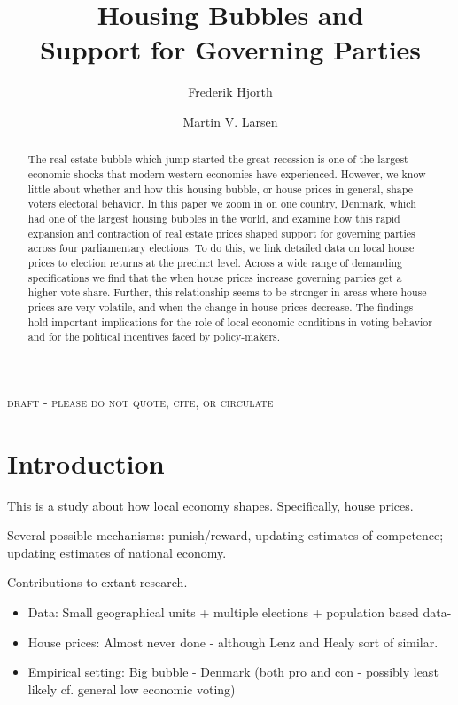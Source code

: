 \documentclass[12pt,a4paper]{article}
\title{\textbf{Housing Bubbles and \\Support for Governing Parties}}
\author{
Frederik Hjorth \and Martin V. Larsen}
\begin{document}
\maketitle

\begin{center}
\textsc{draft - please do not quote, cite, or circulate}
\end{center}

\begin{abstract}
\noindent The real estate bubble which jump-started the great recession is one of the largest economic shocks that modern western economies have experienced. However, we know little about whether and how this housing bubble, or house prices in general, shape voters electoral behavior. In this paper we zoom in on one country, Denmark, which had one of the largest housing bubbles in the world, and examine how this rapid expansion and contraction of real estate prices shaped support for governing parties across four parliamentary elections. To do this, we link detailed data on local house prices to election returns at the precinct level. Across a wide range of demanding specifications we find that the when house prices increase governing parties get a higher vote share. Further, this relationship seems to be stronger in areas where house prices are very volatile, and when the change in house prices decrease. The findings hold important implications for the role of local economic conditions in voting behavior and for the political incentives faced by policy-makers.
 
\end{abstract}



\newpage

\onehalfspacing

\section{Introduction}

This is a study about how local economy shapes. Specifically, house prices.

Several possible mechanisms: punish/reward, updating estimates of competence; updating estimates of national economy.

Contributions to extant research.
\begin{itemize}
	\item Data: Small geographical units + multiple elections + population based data-
	\item House prices: Almost never done - although Lenz and Healy sort of similar.
	\item Empirical setting: Big bubble - Denmark (both pro and con - possibly least likely cf. general low economic voting)
\end{itemize}
\end{document}

